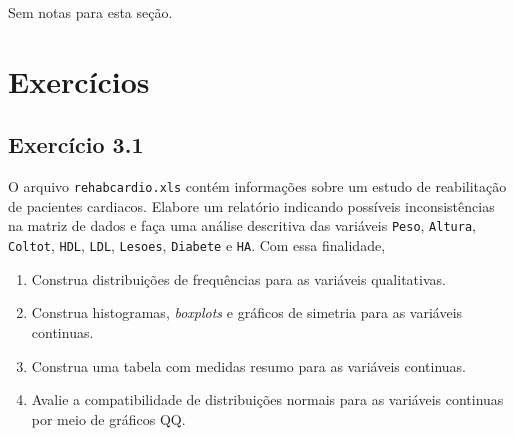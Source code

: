 \documentclass[
]{latex/krantz}
\providecommand{\tightlist}{%
  \setlength{\itemsep}{0pt}\setlength{\parskip}{0pt}}
\theoremstyle{definition}
\theoremstyle{definition}
\theoremstyle{definition}
\theoremstyle{definition}
\theoremstyle{remark}
\begin{document}
Sem notas para esta seção.

\hypertarget{exercuxedcios-1}{%
\section{Exercícios}\label{exercuxedcios-1}}

\hypertarget{exr3-1}{%
\subsection*{Exercício 3.1}\label{exr3-1}}

O arquivo \texttt{rehabcardio.xls} \citep{CarvalhoEtAl2007} contém informações sobre um estudo de reabilitação de pacientes cardiacos. Elabore um relatório indicando possíveis inconsistências na matriz de dados e faça uma análise descritiva das variáveis \texttt{Peso}, \texttt{Altura}, \texttt{Coltot}, \texttt{HDL}, \texttt{LDL}, \texttt{Lesoes}, \texttt{Diabete} e \texttt{HA}. Com essa finalidade,

\begin{enumerate}
\def\labelenumi{\alph{enumi})}
\tightlist
\item
  Construa distribuições de frequências para as variáveis qualitativas.
\item
  Construa histogramas, \emph{boxplots} e gráficos de simetria para as variáveis continuas.
\item
  Construa uma tabela com medidas resumo para as variáveis continuas.
\item
  Avalie a compatibilidade de distribuições normais para as variáveis continuas por meio de gráficos QQ.
\end{enumerate}
\end{document}
